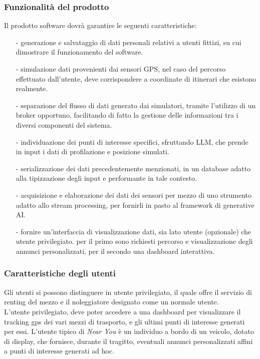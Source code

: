 \documentclass[11pt]{article}
\begin{document}
\begin{justify}
\subsubsection{Funzionalità del prodotto}
Il prodotto software dovrà garantire le seguenti caratteristiche:
\begin{itemize}
    \item [-] generazione e salvataggio di dati personali relativi a utenti fittizi, su cui dimostrare il funzionamento 
    del software.
    \item [-] simulazione dati provenienti dai sensori GPS, nel caso del percorso effettuato dall'utente, 
    deve corrispondere a coordinate di itinerari che esistono realmente.
    \item [-] separazione del flusso di dati generato dai simulatori, tramite l'utilizzo di un broker opportuno, 
    facilitando di fatto la gestione delle informazioni tra i diversi componenti del sistema.
    \item [-] individuazione dei punti di interesse specifici, sfruttando LLM, che prende in input i dati di 
    profilazione e posizione simulati.
    \item [-] serializzazione dei dati precedentemente menzionati, in un database adatto alla tipizzazione degli input 
    e performante in tale contesto.
    \item [-] acquisizione e elaborazione dei dati dei sensori per mezzo di uno strumento adatto allo stream 
    processing, per fornirli in pasto al framework di generative AI.
    \item [-] fornire un'interfaccia di visualizzazione dati, sia lato utente (opzionale) che utente privilegiato. 
    per il primo sono richiesti percorso e visualizzazione degli annunci personalizzati, per il secondo una dashboard 
    interattiva.
    
\end{itemize}

\subsubsection{Caratteristiche degli utenti}
Gli utenti si possono distinguere in utente privilegiato, il quale offre il servizio di renting del mezzo e il 
noleggiatore designato come un normale utente.\\
L'utente privilegiato, deve poter accedere a una dashboard per visualizzare il tracking gps dei vari mezzi di 
trasporto, e gli ultimi punti di interesse generati per essi.
L'utente tipico di \textit{Near You} è un individuo a bordo di un veicolo, dotato di display, che fornisce, durante 
il tragitto, eventuali annunci personalizzati affini a punti di interesse generati ad hoc.

\end{justify}
\end{document}
